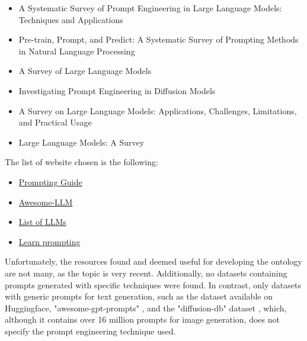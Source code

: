 \begin{itemize}
\item A Systematic Survey of Prompt Engineering in Large Language Models: Techniques and Applications \cite{sahoo2024systematic}

\item Pre-train, Prompt, and Predict: A Systematic Survey of Prompting Methods in Natural Language Processing \cite{liu2023pre}

\item A Survey of Large Language Models \cite{zhao2023survey}

\item Investigating Prompt Engineering in Diffusion
Models \cite{witteveen2022investigating}

\item A Survey on Large Language Models: Applications,
Challenges, Limitations, and Practical Usage \cite{hadi2023survey}

\item Large Language Models: A Survey \cite{minaee2024large}
\end{itemize}
The list of website chosen is the following:
\begin{itemize}
    \item \href{https://www.promptingguide.ai/}{Prompting Guide}
    
    \item \href{https://github.com/Hannibal046/Awesome-LLM}{Awesome-LLM}

    \item \href{https://llmmodels.org/}{List of LLMs}

    \item \href{https://learnprompting.org/}{Learn prompting}
\end{itemize}
Unfortunately, the resources found and deemed useful for developing the ontology are not many, as the topic is very recent.
Additionally, no datasets containing prompts generated with specific techniques were found.
In contrast, only datasets with generic prompts for text generation, such as the dataset available on Huggingface, "awesome-gpt-prompts" \cite{awesome_gpt}, and the "diffusion-db" dataset \cite{diffusion_db}, which, although it contains over 16 million prompts for image generation, does not specify the prompt engineering technique used.

